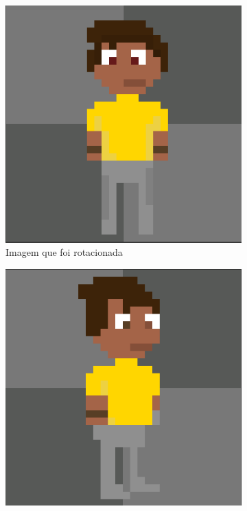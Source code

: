 \begin{figure}[htbp]
    \centering
    \caption{\small Processo da utilização 4 da ferramenta de rotação do PixelLab em julho/2025}
    \label{fig:pixelLabRotacao5}

    \begin{subfigure}{0.32\linewidth}
        \includegraphics[width=1\linewidth]{figs/pixelLab/dia2/sprite_centro.PNG}
        \caption{\small Imagem que foi rotacionada}
        \label{fig:pixelLabRot5a}
    \end{subfigure}
    \begin{subfigure}{0.32\linewidth}
        \includegraphics[width=1\linewidth]{figs/pixelLab/dia2/rotacao 45 graus quick rotate.PNG}

\end{subfigure}
\end{figure}
